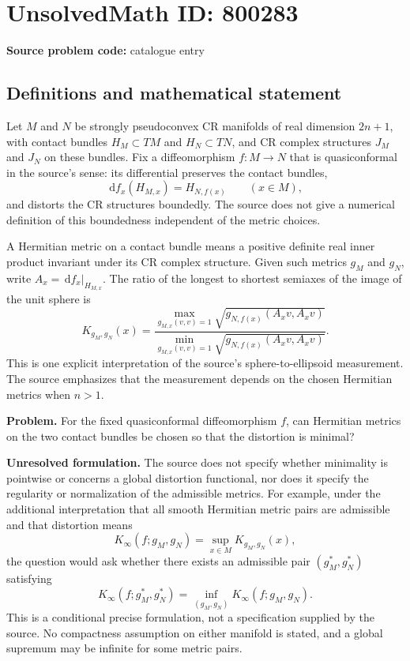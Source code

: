 \documentclass[11pt]{article}
\newcommand{\dd}{\,\mathrm{d}}
\begin{document}
\section*{UnsolvedMath ID: 800283}
\textbf{Source problem code:} catalogue entry
\subsection{Definitions and mathematical statement}
Let \(M\) and \(N\) be strongly pseudoconvex CR manifolds of real dimension \(2n+1\), with contact bundles \(H_M\subset TM\) and \(H_N\subset TN\), and CR complex structures \(J_M\) and \(J_N\) on these bundles. Fix a diffeomorphism \(f:M\to N\) that is quasiconformal in the source's sense: its differential preserves the contact bundles,
\[
\dd f_x(H_{M,x})=H_{N,f(x)}\qquad(x\in M),
\]
and distorts the CR structures boundedly. The source does not give a numerical definition of this boundedness independent of the metric choices.

A Hermitian metric on a contact bundle means a positive definite real inner product invariant under its CR complex structure. Given such metrics \(g_M\) and \(g_N\), write \(A_x=\dd f_x|_{H_{M,x}}\). The ratio of the longest to shortest semiaxes of the image of the unit sphere is
\[
K_{g_M,g_N}(x)
=
\frac{\displaystyle\max_{g_{M,x}(v,v)=1}
\sqrt{g_{N,f(x)}(A_xv,A_xv)}}
{\displaystyle\min_{g_{M,x}(v,v)=1}
\sqrt{g_{N,f(x)}(A_xv,A_xv)}}.
\]
This is one explicit interpretation of the source's sphere-to-ellipsoid measurement. The source emphasizes that the measurement depends on the chosen Hermitian metrics when \(n>1\).

\textbf{Problem.} For the fixed quasiconformal diffeomorphism \(f\), can Hermitian metrics on the two contact bundles be chosen so that the distortion is minimal?

\textbf{Unresolved formulation.} The source does not specify whether minimality is pointwise or concerns a global distortion functional, nor does it specify the regularity or normalization of the admissible metrics. For example, under the additional interpretation that all smooth Hermitian metric pairs are admissible and that distortion means
\[
K_\infty(f;g_M,g_N)=\sup_{x\in M}K_{g_M,g_N}(x),
\]
the question would ask whether there exists an admissible pair \((g_M^*,g_N^*)\) satisfying
\[
K_\infty(f;g_M^*,g_N^*)
=
\inf_{(g_M,g_N)}K_\infty(f;g_M,g_N).
\]
This is a conditional precise formulation, not a specification supplied by the source. No compactness assumption on either manifold is stated, and a global supremum may be infinite for some metric pairs.
\end{document}
